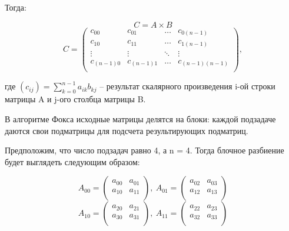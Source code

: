 \documentclass{article}
\begin{document}
Тогда:

\par
\[C=A \times B \]
\[
  C = \left( 
    \begin{matrix}
      c_{00} & c_{0 1} & \ldots & c_{0(n-1)}\\
      c_{10} & c_{1 1} & \ldots & c_{1(n-1)}\\
      \vdots & \vdots & \ddots & \vdots\\
      c_{(n-1)0} & c_{(n-1)1} & \ldots & c_{(n-1)(n-1)}\\
    \end{matrix}
  \right), 
\] 

\par
где $(c_{ij}) = \sum\limits_{k=0}^{n-1}a_{ik}b_{kj}$   – результат скалярного произведения i-ой строки матрицы A и j-ого столбца матрицы B.

\par В алгоритме Фокса исходные матрицы делятся на блоки: каждой подзадаче даются свои подматрицы для подсчета результирующих 
подматриц.

\par
Предположим, что число подзадач равно 4, а n = 4.
Тогда блочное разбиение будет выглядеть следующим образом:

\par
\[ A_{00}= \left( 
  \begin{matrix}
    a_{00}  &  a_{01}\\
    a_{10}  &  a_{11}\\
  \end{matrix}
\right),
~A_{01}= \left( 
  \begin{matrix}
    a_{02}  &   a_{03}\\
    a_{12}  &   a_{13}\\
  \end{matrix}
\right)\] 
\[ A_{10}= \left( 
  \begin{matrix}
    a_{20}  &  a_{21}\\
    a_{30}  &  a_{31}\\
  \end{matrix}
\right),
~A_{11}= \left( 
  \begin{matrix}
    a_{22}  &  a_{23}\\
    a_{32}  &  a_{33}\\
  \end{matrix}
\right)\]
\end{document}

